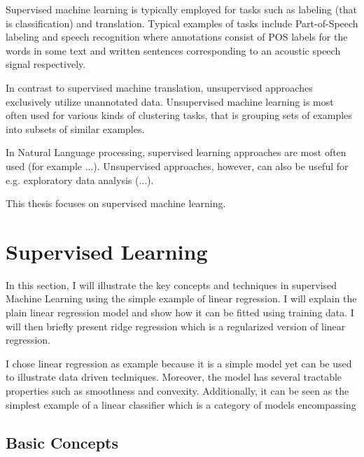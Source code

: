 Supervised machine learning is typically employed for tasks such as
labeling (that is classification) and translation. Typical examples of
tasks include Part-of-Speech labeling and speech recognition where
annotations consist of POS labels for the words in some text and
written sentences corresponding to an acoustic speech signal
respectively.

In contrast to supervised machine translation, unsupervised approaches
exclusively utilize unannotated data. Unsupervised machine learning is
most often used for various kinds of clustering tasks, that is
grouping sets of examples into subsets of similar examples. 

In Natural Language processing, supervised learning approaches are
most often used (for example ...). Unsupervised approaches, however,
can also be useful for e.g. exploratory data analysis (...).

This thesis focuses on supervised machine learning.

\section{Supervised Learning}

In this section, I will illustrate the key concepts and techniques in
supervised Machine Learning using the simple example of linear regression. I will explain the plain linear regression model and show how it can be fitted using training data. I will then briefly present ridge regression which is a regularized version of linear regression.

I chose linear regression as example because it is a simple model yet
can be used to illustrate data driven techniques. Moreover, the model
has several tractable properties such as smoothness and
convexity. Additionally, it can be seen as the simplest example of a
linear classifier which is a category of models encompassing

\subsection{Basic Concepts}

